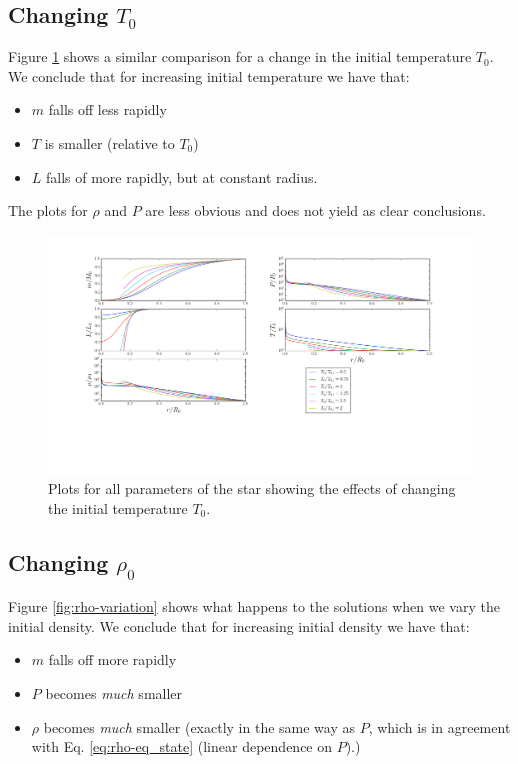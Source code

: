 \documentclass[11pt,twocolumn]{article}
\begin{document}
\subsection{Changing $T_0$}
Figure \ref{fig:T-variation} shows a similar comparison for a change
in the initial temperature $T_0$. We conclude that for increasing
initial temperature we have that:

\begin{itemize}
  \item $m$ falls off less rapidly
  \item $T$ is smaller (relative to $T_0$)
  \item $L$ falls of more rapidly, but at constant radius.
\end{itemize}

The plots for $\rho$ and $P$ are less obvious and does not yield as
clear conclusions. 

\begin{figure}[ht]
  \centering
  \includegraphics[width=\linewidth]{fig/T_variation.png}
  \caption{\label{fig:T-variation} Plots for all parameters of the star
  showing the effects of changing the initial temperature $T_0$.}
\end{figure}


\subsection{Changing $\rho_0$}
Figure \ref{fig:rho-variation} shows what happens to the solutions
when we vary the initial density. We conclude that for increasing
initial density we have that:

\begin{itemize}
\item $m$ falls off more rapidly
\item $P$ becomes \emph{much} smaller
\item $\rho$ becomes \emph{much} smaller (exactly in the same way as
  $P$, which is in agreement with Eq. \eqref{eq:rho-eq_state} (linear
  dependence on $P$).)
\end{itemize}
\end{document}
